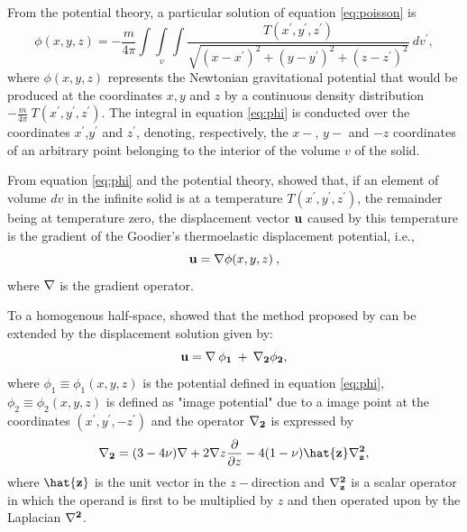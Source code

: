 \documentclass[journal abbreviation, manuscript]{copernicus}
\begin{document}
From the potential theory, a particular solution of equation \ref{eq:poisson} is
\begin{equation}
\phi(x,y,z) = -  \frac{m}{4 \pi} \int\int\limits_{v}\int \frac{T(x^{\prime}, y^{\prime}, z^{\prime} )}{\sqrt{(x - x^{\prime})^{2} + (y - y^{\prime})^{2} + (z - z^{\prime})^{2}}} \: dv^{\prime},
\label{eq:phi}
\end{equation}
where $\phi(x,y,z)$ represents the Newtonian gravitational potential \citep{Kellogg29} that would be produced at the coordinates $x, y$ and $z$ by a continuous density distribution $- \frac{m}{4 \pi}  \: T( x^{\prime}, y^{\prime}, z^{\prime} )$. 
The integral in equation \ref{eq:phi} is conducted over the coordinates $x^{\prime}$,$y^{\prime}$ and $z^{\prime}$, denoting, respectively, the $x-$, $y-$ and $-z$ coordinates of an arbitrary point belonging to the interior of the volume $v$ of the solid. 


From equation \ref{eq:phi} and the potential theory, \citet{Goodier37} showed that, if an element of volume $dv$ in the infinite solid is at a temperature $T(x^{\prime}, y^{\prime}, z^{\prime}) $, the remainder being at temperature zero, the displacement vector $\bf{u}$ caused by this temperature is the gradient of the Goodier’s thermoelastic displacement potential, i.e.,
\begin{equation}
{\bf{u}} = {\bf {\nabla}} \phi(x,y,z) \: ,
\label{eq:displacement-general}
\end{equation}
where $\bf{\nabla}$ is the gradient operator.  

To a homogenous half-space, \citet{Mindlin&Cheng50} showed that the method proposed by  \citet{Goodier37} can be extended by the displacement solution given by:
\begin{equation}
\bf{u} = {\bf{\nabla}} \: \phi_{1} \: + \: {\bf{{\nabla}_{2}}} \phi_{2}, 
\label{eq:displacement-solution}
\end{equation}
where $\phi_{1} \equiv \phi_{1}(x,y,z)$ is the potential defined in equation \ref{eq:phi}, 
$\phi_{2} \equiv  \phi_{2}(x,y,z)$
is defined as "image potential" \citep{Segall92} due to a image point at the coordinates
$(x^{\prime}, y^{\prime}, -z^{\prime} )$ and the operator $\bf{{\nabla}_{2}}$ is expressed by
\begin{equation}
{\bf{{\nabla}_{2}}} = (3 - 4\nu){\bf{\nabla}} + 2 {\bf{\nabla}} z \frac{\partial }{\partial z}  - 4(1- \nu){\bf{\hat{z}}} {\bf{{\nabla}^{2}_{z}}},
\label{eq:nabla2}
\end{equation}
where ${\bf{\hat{z}}}$ is the unit vector in the $z-$direction and 
${\bf{{\nabla}^{2}_{z}}}$ is a scalar operator in which the operand is first to be  multiplied by $z$ and then operated upon by the Laplacian ${\bf{\nabla}^{2}}$. 
\end{document}
